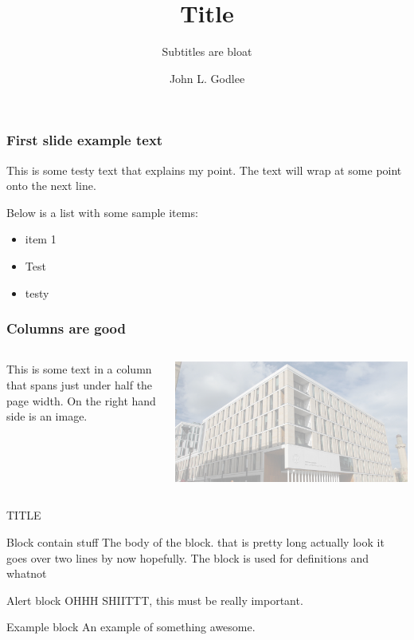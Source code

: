 \documentclass[aspectratio=169]{beamer}
\title{Title}
\subtitle{Subtitles are bloat}
\author{John L. Godlee}
\begin{document}
\maketitle

\begin{frame}
	\frametitle{First slide example text}
	This is some testy text that explains my point. The text will wrap at some point onto the next line.

	Below is a list with some sample items:

	\begin{itemize}
		\item{item 1}
		\item{Test}
		\item{testy}
	\end{itemize}
\end{frame}

\begin{frame}
	\frametitle{Columns are good}
	\begin{columns}

		This is some text in a column that spans just under half the page width. On the right hand side is an image.

		\includegraphics[width=\textwidth]{background}
	\end{columns}
\end{frame}

\begin{frame}{TITLE}
	\begin{block}{Block contain stuff}
		The body of the block. that is pretty long actually look it goes over two lines by now hopefully. The block is used for definitions and whatnot
	\end{block}
	\begin{alertblock}{Alert block}
		OHHH SHIITTT, this must be really important.
	\end{alertblock}
	\begin{exampleblock}{Example block}
		An example of something awesome.
	\end{exampleblock}
\end{frame}
\end{document}

